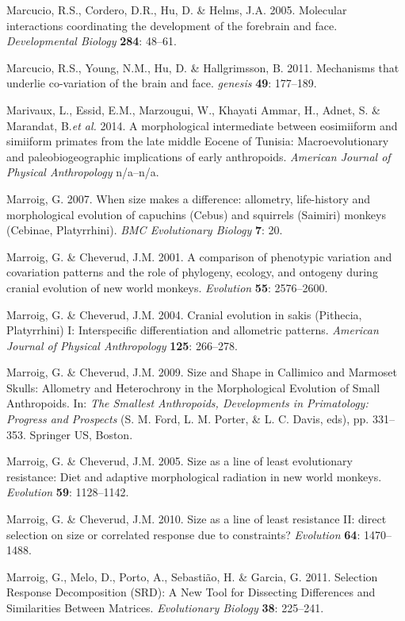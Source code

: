 \documentclass[12pt,twoside]{report}
\begin{document}
Marcucio, R.S., Cordero, D.R., Hu, D. \& Helms, J.A. 2005. Molecular
interactions coordinating the development of the forebrain and face.
\emph{Developmental Biology} \textbf{284}: 48--61.

Marcucio, R.S., Young, N.M., Hu, D. \& Hallgrimsson, B. 2011. Mechanisms
that underlie co-variation of the brain and face. \emph{genesis}
\textbf{49}: 177--189.

Marivaux, L., Essid, E.M., Marzougui, W., Khayati Ammar, H., Adnet, S.
\& Marandat, B.\emph{et al.} 2014. A morphological intermediate between
eosimiiform and simiiform primates from the late middle Eocene of
Tunisia: Macroevolutionary and paleobiogeographic implications of early
anthropoids. \emph{American Journal of Physical Anthropology} n/a--n/a.

Marroig, G. 2007. When size makes a difference: allometry, life-history
and morphological evolution of capuchins (Cebus) and squirrels (Saimiri)
monkeys (Cebinae, Platyrrhini). \emph{BMC Evolutionary Biology}
\textbf{7}: 20.

Marroig, G. \& Cheverud, J.M. 2001. A comparison of phenotypic variation
and covariation patterns and the role of phylogeny, ecology, and
ontogeny during cranial evolution of new world monkeys. \emph{Evolution}
\textbf{55}: 2576--2600.

Marroig, G. \& Cheverud, J.M. 2004. Cranial evolution in sakis
(Pithecia, Platyrrhini) I: Interspecific differentiation and allometric
patterns. \emph{American Journal of Physical Anthropology} \textbf{125}:
266--278.

Marroig, G. \& Cheverud, J.M. 2009. Size and Shape in Callimico and
Marmoset Skulls: Allometry and Heterochrony in the Morphological
Evolution of Small Anthropoids. In: \emph{The Smallest Anthropoids,
Developments in Primatology: Progress and Prospects} (S. M. Ford, L. M.
Porter, \& L. C. Davis, eds), pp. 331--353. Springer US, Boston.

Marroig, G. \& Cheverud, J.M. 2005. Size as a line of least evolutionary
resistance: Diet and adaptive morphological radiation in new world
monkeys. \emph{Evolution} \textbf{59}: 1128--1142.

Marroig, G. \& Cheverud, J.M. 2010. Size as a line of least resistance
II: direct selection on size or correlated response due to constraints?
\emph{Evolution} \textbf{64}: 1470--1488.

Marroig, G., Melo, D., Porto, A., Sebastião, H. \& Garcia, G. 2011.
Selection Response Decomposition (SRD): A New Tool for Dissecting
Differences and Similarities Between Matrices. \emph{Evolutionary
Biology} \textbf{38}: 225--241.
\end{document}
